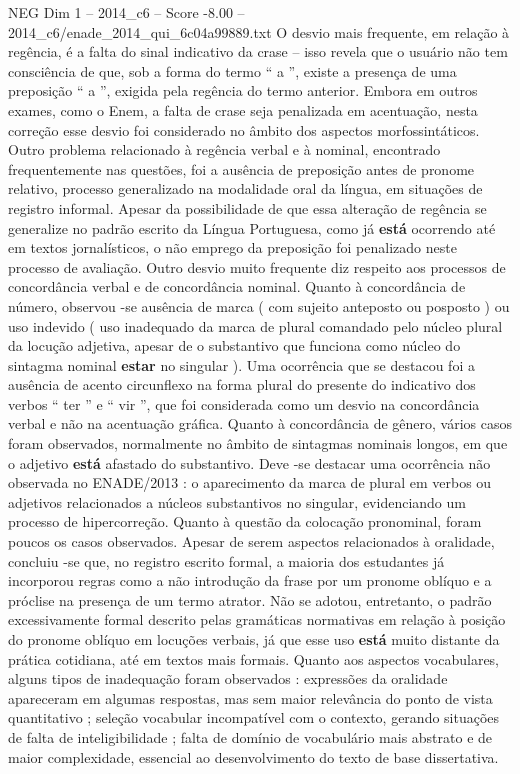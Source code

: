 \begin{textsample}{NEG Dim 1 – 2014\_c6 – Score -8.00 – 2014\_c6/enade\_2014\_qui\_6c04a99889.txt}
O desvio mais frequente, em relação à regência, é a falta do sinal indicativo da crase – isso revela que o usuário não tem consciência de que, sob a forma do termo “ a ”, existe a presença de uma preposição “ a ”, exigida pela regência do termo anterior.
Embora em outros exames, como o Enem, a falta de crase seja penalizada em acentuação, nesta correção esse desvio foi considerado no âmbito dos aspectos morfossintáticos.
Outro problema relacionado à regência verbal e à nominal, encontrado frequentemente nas questões, foi a ausência de preposição antes de pronome relativo, processo generalizado na modalidade oral da língua, em situações de registro informal.
Apesar da possibilidade de que essa alteração de regência se generalize no padrão escrito da Língua Portuguesa, como já \textbf{está} ocorrendo até em textos jornalísticos, o não emprego da preposição foi penalizado neste processo de avaliação.
Outro desvio muito frequente diz respeito aos processos de concordância verbal e de concordância nominal.
Quanto à concordância de número, observou -se ausência de marca ( com sujeito anteposto ou posposto ) ou uso indevido ( uso inadequado da marca de plural comandado pelo núcleo plural da locução adjetiva, apesar de o substantivo que funciona como núcleo do sintagma nominal \textbf{estar} no singular ).
Uma ocorrência que se destacou foi a ausência de acento circunflexo na forma plural do presente do indicativo dos verbos “ ter ” e “ vir ”, que foi considerada como um desvio na concordância verbal e não na acentuação gráfica.
Quanto à concordância de gênero, vários casos foram observados, normalmente no âmbito de sintagmas nominais longos, em que o adjetivo \textbf{está} afastado do substantivo.
Deve -se destacar uma ocorrência não observada no ENADE/2013 : o aparecimento da marca de plural em verbos ou adjetivos relacionados a núcleos substantivos no singular, evidenciando um processo de hipercorreção.
Quanto à questão da colocação pronominal, foram poucos os casos observados.
Apesar de serem aspectos relacionados à oralidade, concluiu -se que, no registro escrito formal, a maioria dos estudantes já incorporou regras como a não introdução da frase por um pronome oblíquo e a próclise na presença de um termo atrator.
Não se adotou, entretanto, o padrão excessivamente formal descrito pelas gramáticas normativas em relação à posição do pronome oblíquo em locuções verbais, já que esse uso \textbf{está} muito distante da prática cotidiana, até em textos mais formais.
Quanto aos aspectos vocabulares, alguns tipos de inadequação foram observados : expressões da oralidade apareceram em algumas respostas, mas sem maior relevância do ponto de vista quantitativo ; seleção vocabular incompatível com o contexto, gerando situações de falta de inteligibilidade ; falta de domínio de vocabulário mais abstrato e de maior complexidade, essencial ao desenvolvimento do texto de base dissertativa.

\end{textsample}
